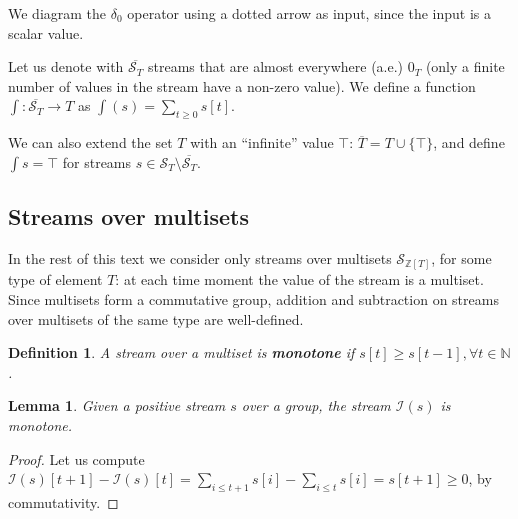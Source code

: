 \documentclass[10pt]{article}
\newtheorem{lemma}{Lemma}[section]
\newtheorem{definition}{Definition}[section]
\newcommand{\Z}{\mathbb{Z}}  %
\newcommand{\N}{\mathbb{N}}  %
\newcommand{\stream}[1]{\ensuremath{\mathcal{S}_{#1}}}
\newcommand{\streamf}[1]{\ensuremath{\overline{\mathcal{S}_{#1}}}}
\newcommand{\I}{\mathcal{I}}  %
\begin{document}
We diagram the $\delta_0$ operator using a dotted arrow as input, since
the input is a scalar value.


Let us denote with $\streamf{T}$ streams that are almost everywhere
(a.e.)  $0_T$ (only a finite number of values in the stream have a
non-zero value).  We define a function $\int : \streamf{T} \rightarrow
T$ as $\int(s) = \sum_{t \geq 0} s[t]$.

We can also extend the set $T$ with an ``infinite'' value $\top$:
$\overline{T} = T \cup \{ \top \}$, and define $\int{s} = \top$ for
streams $s \in \stream{T} \setminus \streamf{T}$.


\subsection{Streams over multisets}

In the rest of this text we consider only streams over multisets
$\stream{\Z[T]}$, for some type of element $T$: at each time moment the
value of the stream is a multiset.  Since multisets form a commutative
group, addition and subtraction on streams over multisets of the same
type are well-defined.

\begin{definition}
A stream over a multiset is \textbf{monotone} if $s[t] \geq s[t-1],
\forall t \in \N$.
\end{definition}

\begin{lemma}
Given a positive stream $s$ over a group, the stream $\I(s)$ is
monotone.
\end{lemma}
\begin{proof}
  Let us compute $\I(s)[t + 1] - \I(s)[t] = \sum_{i \leq t+1}s[i] -
  \sum_{i \leq t}s[i] = s[t+1] \geq 0$, by commutativity.
\end{proof}
\end{document}
